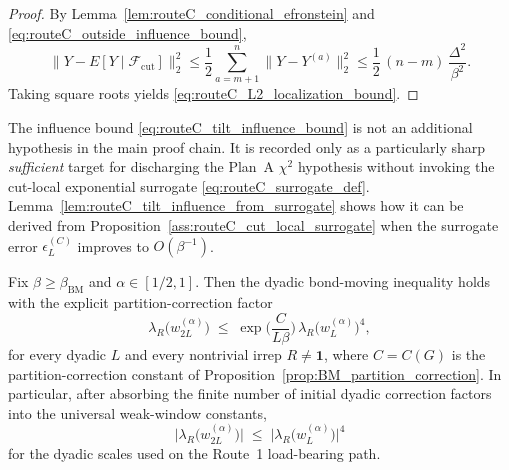 \begin{proof}
By Lemma~\ref{lem:routeC_conditional_efronstein} and \eqref{eq:routeC_outside_influence_bound},
\[
\big\|Y-E[Y\mid\mathscr F_{\mathrm{cut}}]\big\|_{2}^2
\le \frac12\sum_{a=m+1}^{n}\|Y-Y^{(a)}\|_2^2
\le \frac12\,(n-m)\,\frac{\Delta^2}{\beta^2}.
\]
Taking square roots yields \eqref{eq:routeC_L2_localization_bound}.
\end{proof}

\medskip
\noindent
The influence bound \eqref{eq:routeC_tilt_influence_bound} is not an additional hypothesis in the main proof chain.
It is recorded only as a particularly sharp \emph{sufficient} target for discharging the Plan~A $\chi^2$ hypothesis
without invoking the cut-local exponential surrogate \eqref{eq:routeC_surrogate_def}.
Lemma~\ref{lem:routeC_tilt_influence_from_surrogate} shows how it can be derived from Proposition~\ref{ass:routeC_cut_local_surrogate}
when the surrogate error $\epsilon_L^{(C)}$ improves to $O(\beta^{-1})$.


\begin{proposition}\label{prop:BM_dyadic}
Fix $\beta\ge\beta_{\mathrm{BM}}$ and $\alpha\in[1/2,1]$.
Then the dyadic bond-moving inequality holds with the explicit partition-correction factor
\begin{equation}\label{eq:BM_dyadic_with_correction}
\lambda_R\!\bigl(w^{(\alpha)}_{2L}\bigr)\;\le\;\exp\!\Big(\frac{C}{L\beta}\Big)\,\lambda_R\!\bigl(w^{(\alpha)}_{L}\bigr)^4,
\end{equation}
for every dyadic $L$ and every nontrivial irrep $R\neq\mathbf 1$, where $C=C(G)$ is the partition-correction constant of Proposition~\ref{prop:BM_partition_correction}.
In particular, after absorbing the finite number of initial dyadic correction factors into the universal weak-window constants,
\begin{equation}\label{eq:BM_dyadic_step}
\big|\lambda_R\!\bigl(w^{(\alpha)}_{2L}\bigr)\big|
\;\le\;
\big|\lambda_R\!\bigl(w^{(\alpha)}_{L}\bigr)\big|^{4}
\end{equation}
for the dyadic scales used on the Route~1 load-bearing path.

\begin{center}
\end{center}
\end{proposition}

